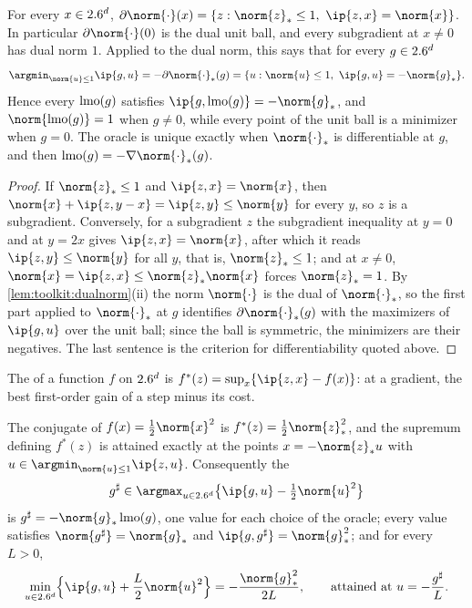 \begin{refsection}
\begin{lemma}\label{lem:toolkit:subdiff}
For every $x\in2.6^d$, $\partial\norm{\cdot}(x)=\{z:\norm{z}_*\le1,\ \ip{z,x}=\norm{x}\}$. In particular $\partial\norm{\cdot}(0)$ is the dual unit ball, and every subgradient at $x\ne0$ has dual norm $1$. Applied to the dual norm, this says that for every $g\in2.6^d$
\begin{equation}\label{eq:toolkit:lmo}
  \argmin_{\norm{u}\le1}\ip{g,u}=-\partial\norm{\cdot}_*(g)=\{u:\norm{u}\le1,\ \ip{g,u}=-\norm{g}_*\}.
\end{equation}
Hence every  $\operatorname{lmo}(g)$ satisfies $\ip{g,\lmo(g)}=-\norm{g}_*$, and $\norm{\lmo(g)}=1$ when $g\ne0$, while every point of the unit ball is a minimizer when $g=0$. The oracle is unique exactly when $\norm{\cdot}_*$ is differentiable at $g$, and then $\lmo(g)=-\nabla\norm{\cdot}_*(g)$.
\end{lemma}

\begin{proof}
If $\norm{z}_*\le1$ and $\ip{z,x}=\norm{x}$, then $\norm{x}+\ip{z,y-x}=\ip{z,y}\le\norm{y}$ for every $y$, so $z$ is a subgradient. Conversely, for a subgradient $z$ the subgradient inequality at $y=0$ and at $y=2x$ gives $\ip{z,x}=\norm{x}$, after which it reads $\ip{z,y}\le\norm{y}$ for all $y$, that is, $\norm{z}_*\le1$; and at $x\ne0$, $\norm{x}=\ip{z,x}\le\norm{z}_*\norm{x}$ forces $\norm{z}_*=1$. By \cref{lem:toolkit:dualnorm}(ii) the norm $\norm{\cdot}$ is the dual of $\norm{\cdot}_*$, so the first part applied to $\norm{\cdot}_*$ at $g$ identifies $\partial\norm{\cdot}_*(g)$ with the maximizers of $\ip{g,u}$ over the unit ball; since the ball is symmetric, the minimizers are their negatives. The last sentence is the criterion for differentiability quoted above.
\end{proof}

The  of a function $f$ on $2.6^d$ is $f^*(z)=\sup_x\{\ip{z,x}-f(x)\}$: at a gradient, the best first-order gain of a step minus its cost.

\begin{lemma}\label{lem:toolkit:conjugate}
The conjugate of $f(x)=\frac12\norm{x}^2$ is $f^*(z)=\frac12\norm{z}_*^2$, and the supremum defining $f^*(z)$ is attained exactly at the points $x=-\norm{z}_*u$ with $u\in\argmin_{\norm{u}\le1}\ip{z,u}$. Consequently the 
\[
  g^\sharp\in\argmax_{u\in\R^d}\bigl\{\ip{g,u}-\tfrac12\norm{u}^2\bigr\}
\]
is $g^\sharp=-\norm{g}_*\lmo(g)$, one value for each choice of the oracle; every value satisfies $\norm{g^\sharp}=\norm{g}_*$ and $\ip{g,g^\sharp}=\norm{g}_*^2$; and for every $L>0$,
\begin{equation}\label{eq:toolkit:quadmin}
  \min_{u\in\R^d}\Bigl\{\ip{g,u}+\frac L2\norm{u}^2\Bigr\}=-\frac{\norm{g}_*^2}{2L},\qquad\text{attained at }u=-\frac{g^\sharp}{L}.
\end{equation}
\end{lemma}


\end{refsection}
